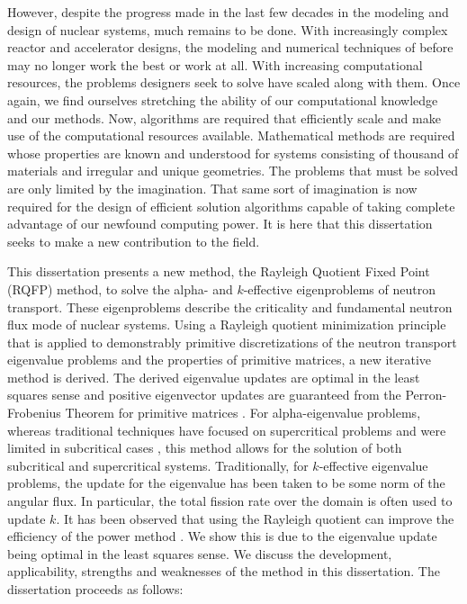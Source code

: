 However, despite the progress made in the last few decades in the modeling and design of nuclear systems, much remains to be done. With increasingly complex reactor and accelerator designs, the modeling and numerical techniques of before may no longer work the best or work at all. With increasing computational resources, the problems designers seek to solve have scaled along with them. Once again, we find ourselves stretching the ability of our computational knowledge and our methods. Now, algorithms are required that efficiently scale and make use of the computational resources available. Mathematical methods are required whose properties are known and understood for systems consisting of thousand of materials and irregular and unique geometries. The problems that must be solved are only limited by the imagination. That same sort of imagination is now required for the design of efficient solution algorithms capable of taking complete advantage of our newfound computing power. It is here that this dissertation seeks to make a new contribution to the field. 

This dissertation presents a new method, the Rayleigh Quotient Fixed Point (RQFP) method, to solve the alpha- and $k$-effective eigenproblems of neutron transport. These eigenproblems describe the criticality and fundamental neutron flux mode of nuclear systems. Using a Rayleigh quotient minimization principle that is applied to demonstrably primitive discretizations of the neutron transport eigenvalue problems and the properties of primitive matrices, a new iterative method is derived. The derived eigenvalue updates are optimal in the least squares sense and positive eigenvector updates are guaranteed from the Perron-Frobenius Theorem for primitive matrices \cite{birkhoff_reactor_1958} \cite{birkhoff_positivity_1961}. For alpha-eigenvalue problems, whereas traditional techniques have focused on supercritical problems and were limited in subcritical cases \cite{hill_efficient_1983}, this method allows for the solution of both subcritical and supercritical systems. Traditionally, for $k$-effective eigenvalue problems, the update for the eigenvalue has been taken to be some norm of the angular flux. In particular, the total fission rate over the domain is often used to update $k$. It has been observed that using the Rayleigh quotient can improve the efficiency of the power method \cite{warsa2004krylov}. We show this is due to the eigenvalue update being optimal in the least squares sense. 
We discuss the development, applicability, strengths and weaknesses of the method in this dissertation. The dissertation proceeds as follows:

